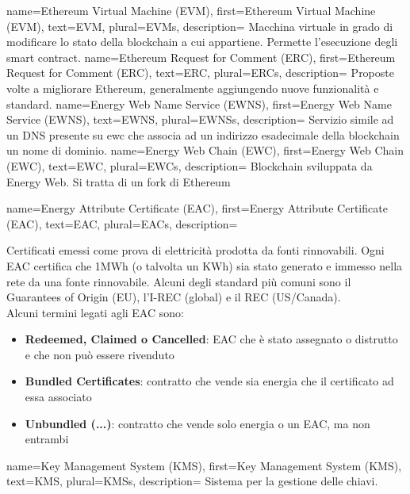 {
    name={Ethereum Virtual Machine (EVM)},
    first={Ethereum Virtual Machine (EVM)},
    text={EVM},
    plural={EVMs},
    description={
            Macchina virtuale in grado di modificare lo stato della blockchain a cui appartiene.
            Permette l'esecuzione degli smart contract.
        }
}
{
    name={Ethereum Request for Comment (ERC)},
    first={Ethereum Request for Comment (ERC)},
    text={ERC},
    plural={ERCs},
    description={
            Proposte volte a migliorare Ethereum, generalmente aggiungendo nuove funzionalità e standard.
        }
}
{
    name={Energy Web Name Service (EWNS)},
    first={Energy Web Name Service (EWNS)},
    text={EWNS},
    plural={EWNSs},
    description={
            Servizio simile ad un DNS presente su \gls{ewc} che associa ad un indirizzo esadecimale della blockchain un nome di dominio.
        }
}
{
    name={Energy Web Chain (EWC)},
    first={Energy Web Chain (EWC)},
    text={EWC},
    plural={EWCs},
    description={
            Blockchain sviluppata da Energy Web. Si tratta di un fork di Ethereum
        }
}
{
    name={Energy Attribute Certificate (EAC)},
    first={Energy Attribute Certificate (EAC)},
    text={EAC},
    plural={EACs},
    description={
            Certificati emessi come prova di elettricità prodotta da fonti rinnovabili.
            Ogni EAC certifica che 1MWh (o talvolta un KWh) sia stato generato e immesso nella rete da una fonte rinnovabile.
            Alcuni degli standard più comuni sono il Guarantees of Origin (EU), l'I-REC (global) e il REC (US/Canada). \\
            Alcuni termini legati agli EAC sono:
            \begin{itemize}
                \item \textbf{Redeemed, Claimed o Cancelled}: EAC che è stato assegnato o distrutto e che non può essere rivenduto
                \item \textbf{Bundled Certificates}: contratto che vende sia energia che il certificato ad essa associato
                \item \textbf{Unbundled (...)}: contratto che vende solo energia o un EAC, ma non entrambi
            \end{itemize}
        }
}
{
    name={Key Management System (KMS)},
    first={Key Management System (KMS)},
    text={KMS},
    plural={KMSs},
    description={
            Sistema per la gestione delle chiavi.
        }
}
